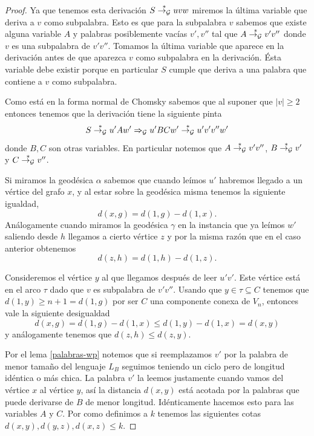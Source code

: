 \documentclass[tesis.tex]{subfiles}
\begin{document}
\begin{proof}
	Ya que tenemos esta derivación $S \overset{*}{\to_{\cal G}} uvw$ miremos la última variable que deriva a $v$ como subpalabra. 
	Esto es que para la subpalabra $v$ sabemos que existe alguna variable $A$ y palabras posiblemente vacías $v',v''$ tal que $A \overset{*}{\to_{\cal G}} v'v''$ donde $v$ es una subpalabra de $v'v''$. 
	Tomamos la última variable que aparece en la derivación antes de que aparezca $v$ como subpalabra en la derivación.
	Ésta variable debe existir porque en particular $S$ cumple que deriva a una palabra que contiene a $v$ como subpalabra.
	
	Como está en la forma normal de Chomsky sabemos que al suponer que $|v| \ge 2$ entonces tenemos que la derivación tiene la siguiente pinta
	\begin{equation*}
		S \overset{*}{\to_{\cal G}} u'Aw' \Rightarrow_{\cal G} u'BC w' \overset{*}{\to_{\cal G}} u'v'v''w'
	\end{equation*}
	donde $B,C$ son otras variables. 
	En particular notemos que $A \overset{*}{\to_{\cal G}} v'v''$, $B \overset{*}{\to_{\cal G}} v'$ y $C \overset{*}{\to_{\cal G}} v''$.
	
	
	Si miramos la geodésica $\alpha$ sabemos que cuando leímos $u'$ habremos llegado a un vértice del grafo $x$, y al estar sobre la geodésica misma tenemos la siguiente igualdad,
	\begin{equation*}
		d(x,g) = d(1,g) - d(1,x).
	\end{equation*}
	Análogamente cuando miramos la geodésica $\gamma$ en la instancia que ya leímos $w'$ saliendo desde $h$ llegamos a cierto vértice $z$ y por la misma razón que en el caso anterior obtenemos
	\begin{equation*}
		d(z,h) = d(1,h) - d(1,z).
	\end{equation*}

	Consideremos el vértice $y$ al que llegamos después de leer $u'v'$.
	Este vértice está en el arco $\tau$ dado que $v$ es subpalabra de $v'v''$.
	Usando que $y \in \tau \subseteq C $ tenemos que $d(1,y) \ge n+1 = d(1,g)$ por ser $C$ una componente conexa de $V_n$, entonces vale la siguiente desigualdad
	\begin{equation*}
		d(x,g) = d(1,g) - d(1,x) \le d(1,y) - d(1,x) = d(x,y)
	\end{equation*}
	y análogamente tenemos que $d(z,h) \le d(z,y)$.
	
	
	Por el lema \ref{palabras-wp} notemos que si reemplazamos $v'$ por la palabra de menor tamaño del lenguaje $L_B$ seguimos teniendo un ciclo pero de longitud idéntica o más chica. 
	La palabra $v'$ la leemos justamente cuando vamos del vértice $x$ al vértice $y$, así la distancia  $d(x,y)$ está acotada por la palabras que puede derivarse de $B$ de menor longitud. 
	Idénticamente hacemos esto para las variables $A$ y $C$.
	Por como definimos a $k$ tenemos las siguientes cotas $d(x,y), d(y,z), d(x,z) \le k$.
	

\end{proof}
\end{document}
